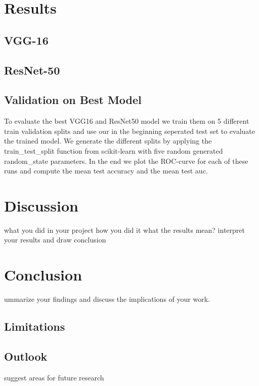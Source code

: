 \documentclass[sn-mathphys,Numbered]{sn-jnl}%
\theoremstyle{thmstyleone}%
\theoremstyle{thmstyletwo}%
\theoremstyle{thmstylethree}%
\begin{document}
\section{Results}\label{Results}
\subsection{VGG-16}\label{VGG-16_Results}
\subsection{ResNet-50}\label{ResNet_Results}
\subsection{Validation on Best Model}\label{CV_Results}
To evaluate the best VGG16 and ResNet50 model we train them on 5 different train validation splits and use our in the beginning seperated test set to evaluate the trained model. We generate the different splits by applying the train\_test\_split function from scikit-learn with five random generated random\_state parameters. In the end we plot the ROC-curve for each of these runs and compute the mean test accuracy and the mean test auc.\\

\section{Discussion}\label{Discussion}
what you did in your project
how you did it
what the results mean?
interpret your results and draw conclusion

\section{Conclusion}\label{conclusion}
ummarize your findings and discuss the implications of your work.
\subsection{Limitations}\label{limitation}
\subsection{Outlook}\label{outlook}
suggest areas for future research 
\end{document}
